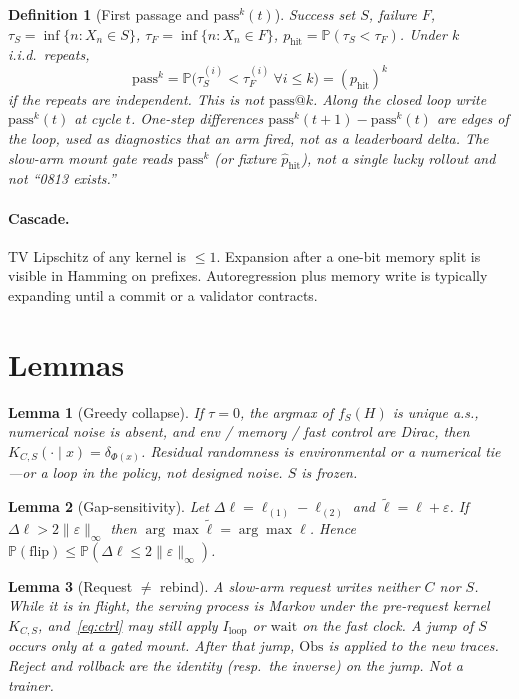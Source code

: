 \documentclass{article}
\newtheorem{lemma}{Lemma}
\newtheorem{definition}{Definition}
\begin{document}
\begin{definition}[First passage and \(\mathrm{pass}^k(t)\)]
\label{def:passk}
Success set \(S\), failure \(F\), \(\tau_S=\inf\{n:X_n\in S\}\), \(\tau_F=\inf\{n:X_n\in F\}\), \(p_{\mathrm{hit}}=\mathbb{P}(\tau_S<\tau_F)\). Under \(k\) i.i.d.\ repeats,
\[
\mathrm{pass}^k=\mathbb{P}\big(\tau_S^{(i)}<\tau_F^{(i)}\ \forall i\le k\big)=(p_{\mathrm{hit}})^k
\]
if the repeats are independent. This is \emph{not} \(\mathrm{pass}@k\). Along the closed loop write \(\mathrm{pass}^k(t)\) at cycle \(t\). One-step differences \(\mathrm{pass}^k(t+1)-\mathrm{pass}^k(t)\) are edges of the loop, used as diagnostics that an arm fired, not as a leaderboard delta. The slow-arm mount gate reads \(\mathrm{pass}^k\) (or fixture \(\hat p_{\mathrm{hit}}\)), not a single lucky rollout and not ``0813 exists.''
\end{definition}

\paragraph{Cascade.}
TV Lipschitz of any kernel is \(\le 1\). Expansion after a one-bit memory split is visible in Hamming on prefixes. Autoregression plus memory write is typically expanding until a commit or a validator contracts.

\section{Lemmas}
\label{sec:lemmas}

\begin{lemma}[Greedy collapse]
If \(\tau=0\), the argmax of \(f_S(H)\) is unique a.s., numerical noise is absent, and env / memory / fast control are Dirac, then \(K_{C,S}(\cdot\mid x)=\delta_{\Phi(x)}\). Residual randomness is environmental or a numerical tie---or a loop in the policy, not designed noise. \(S\) is frozen.
\end{lemma}

\begin{lemma}[Gap-sensitivity]\label{lem:gap}
Let \(\Delta\ell=\ell_{(1)}-\ell_{(2)}\) and \(\tilde\ell=\ell+\varepsilon\). If \(\Delta\ell>2\|\varepsilon\|_\infty\) then \(\arg\max\tilde\ell=\arg\max\ell\). Hence \(\mathbb{P}(\mathrm{flip})\le\mathbb{P}(\Delta\ell\le 2\|\varepsilon\|_\infty)\).
\end{lemma}

\begin{lemma}[Request \(\neq\) rebind]\label{lem:spawn}
A slow-arm request writes neither \(C\) nor \(S\). While it is in flight, the serving process is Markov under the pre-request kernel \(K_{C,S}\), and~\eqref{eq:ctrl} may still apply \(I_{\mathrm{loop}}\) or \(\mathrm{wait}\) on the fast clock. A jump of \(S\) occurs only at a gated mount. After that jump, \(\mathrm{Obs}\) is applied to the new traces. Reject and rollback are the identity (resp.\ the inverse) on the jump. Not a trainer.
\end{lemma}
\end{document}
